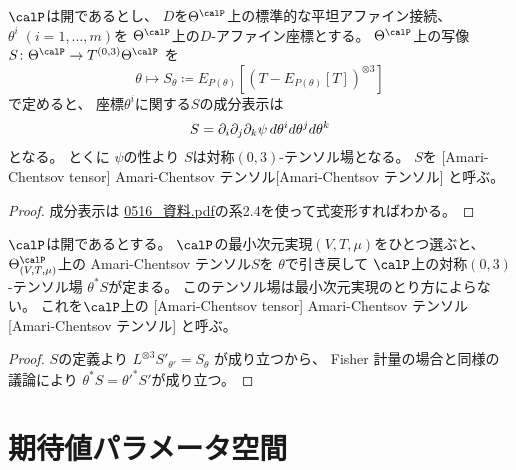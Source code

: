\documentclass[report]{jlreq}
\begin{document}
\begin{propdef}
    $\calP$は開であるとし、
    $D$を$\Theta^\calP$上の標準的な平坦アファイン接続、
    $\theta^i \; (i = 1, \dots, m)$を
    $\Theta^\calP$上の$D$-アファイン座標とする。
    $\Theta^\calP$上の写像
    $S \colon \Theta^\calP \to T^{(0, 3)} \Theta^\calP$
    を
    \begin{equation}
        \theta
            \mapsto
                S_\theta
                \coloneqq
                E_{P(\theta)}[
                    (T - E_{P(\theta)}[T])^{\otimes 3}
                ]
    \end{equation}
    で定めると、
    座標$\theta^i$に関する$S$の成分表示は
    \begin{equation}
        S
            = \partial_i \partial_j \partial_k \psi \, d\theta^i d\theta^j d\theta^k
    \end{equation}
    となる。
    とくに
    $\psi$の\smooth 性より
    $S$は対称$(0, 3)$-テンソル場となる。
    $S$を
    [Amari-Chentsov tensor]
        {Amari-Chentsov テンソル}[Amari-Chentsov テンソル]
    と呼ぶ。
\end{propdef}

\begin{proof}
    成分表示は
    \url{0516_資料.pdf}の系2.4を使って式変形すればわかる。
\end{proof}

\begin{propdef}
    $\calP$は開であるとする。
    $\calP$の最小次元実現$(V, T, \mu)$をひとつ選ぶと、
    $\Theta^\calP_{(V, T, \mu)}$上の Amari-Chentsov テンソル$S$を
    $\theta$で引き戻して
    $\calP$上の対称$(0, 3)$-テンソル場
    $\theta^* S$が定まる。
    このテンソル場は最小次元実現のとり方によらない。
    これを$\calP$上の
    [Amari-Chentsov tensor]
        {Amari-Chentsov テンソル}[Amari-Chentsov テンソル]
    と呼ぶ。
\end{propdef}

\begin{proof}
    $S$の定義より
    $L^{\otimes 3} S'_{\theta'} = S_\theta$
    が成り立つから、
    Fisher 計量の場合と同様の議論により
    $\theta^* S = \theta'^* S'$が成り立つ。
\end{proof}


%
\section{期待値パラメータ空間}
\end{document}
